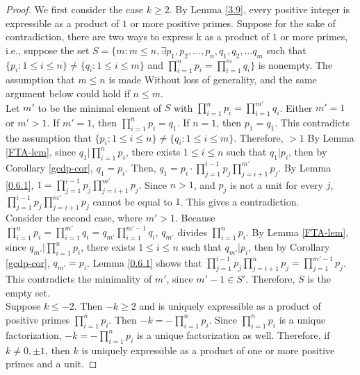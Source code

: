 \documentclass{article}
\newcommand{\SFTSOC}{Suppose for the sake of contradiction}
\newcommand{\WLOG}{Without loss of generality}
\newcommand{\st}{such that }
\begin{document}
\begin{proof}
We first consider the case $k \geq 2$. By Lemma \ref{3.9}, every positive integer is expressible as a product of $1$ or more positive primes. \SFTSOC, there are two ways to express k as a product of $1$ or more primes, i.e., suppose the set $S = \{m : m\leq n, \exists p_1, p_2, \ldots, p_n, q_1, q_2, \ldots q_m$ such that $\{p_i: 1 \leq i \leq n\} \neq \{q_i: 1 \leq i \leq m\}$ and $\prod_{i=1}^n p_i = \prod_{i=1}^m q_i\}$ is nonempty. The assumption that $m \leq n$ is made \WLOG, and the same argument below could hold if $n \leq m$. \\

 Let $m'$ to be the minimal element of $S$ with $\prod_{i=1}^n p_i = \prod_{i=1}^{m'} q_i$. Either $m'=1$ or $m'>1$. If $m'=1$, then $\prod_{i=1}^n p_i = q_1$.  If $n=1$, then $p_1=q_1$. This contradicts the assumption that $\{p_i: 1 \leq i \leq n\} \neq \{q_i: 1 \leq i \leq m\}$. Therefore, $>1$ By Lemma \ref{FTA-lem}, since $q_1|\prod_{i=1}^n p_i$, there exists $1 \leq i \leq n$ \st $q_1|p_i$, then by Corollary \ref{gcdp-cor}, $q_1=p_i$. Then, $q_1 = p_i \cdot \prod_{j=1}^{i-1} p_j \prod_{j=i+1}^{m'} p_j$. By Lemma \ref{0.6.1}, $1 = \prod_{j=1}^{i-1} p_j \prod_{j=i+1}^{m'} p_j$. Since $n > 1$, and $p_j$ is not a unit for every $j$, $\prod_{j=1}^{i-1} p_j \prod_{j=i+1}^{m'} p_j$ cannot be equal to $1$. This gives a contradiction. \\
 
Consider the second case, where $m'>1$. Because $\prod_{i=1}^n p_i = \prod_{i=1}^{m'} q_i = q_{m'} \prod_{i=1}^{m'-1} q_i$, $q_{m'}$ divides $\prod_{i=1}^n p_i$. By Lemma \ref{FTA-lem}, since $q_{m'}|\prod_{i=1}^n p_i$, there exists $1 \leq i \leq n$ \st $q_{m'}|p_i$, then by Corollary \ref{gcdp-cor}, $q_{m'}=p_i$. Lemma \ref{0.6.1} shows that $\prod_{j=1}^{i-1} p_j \prod_{j=i+1}^{n} p_j = \prod_{j=1}^{m'-1} p_j$. This contradicts the minimality of $m'$, since $m'-1 \in S'$. Therefore, $S$ is the empty set.  \\

Suppose $k \leq -2$. Then $-k \geq 2$ and is uniquely expressible as a product of positive primes $\prod_{i=1}^n p_i$. Then $-k = -\prod_{i=1}^n p_i$. Since $\prod_{i=1}^n p_i$ is a unique factorization, $-k = -\prod_{i=1}^n p_i$ is a unique factorization as well. Therefore, if $k \neq 0, \pm 1$, then $k$ is uniquely expressible as a product of one or more positive primes and a unit.
\end{proof}
\end{document}
